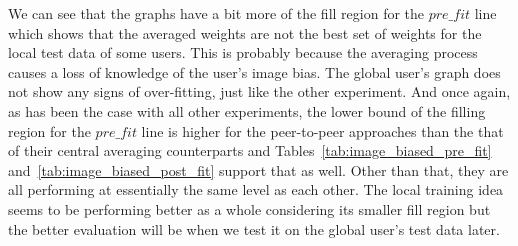 \documentclass[12pt]{article}
\begin{document}
\noindent We can see that the graphs have a bit more of the fill region for the $pre\_fit$ line which shows that the averaged weights are not the best set of weights for the local test data of some users. This is probably because the averaging process causes a loss of knowledge of the user's image bias. The global user's graph does not show any signs of over-fitting, just like the other experiment. And once again, as has been the case with all other experiments, the lower bound of the filling region for the $pre\_fit$ line is higher for the peer-to-peer approaches than the that of their central averaging counterparts and Tables~\ref{tab:image_biased_pre_fit} and~\ref{tab:image_biased_post_fit} support that as well. Other than that, they are all performing at essentially the same level as each other. The local training idea seems to be performing better as a whole considering its smaller fill region but the better evaluation will be when we test it on the global user's test data later.
\begin{table}[H] %
\def\arraystretch{1.2}%
\caption{Images dataset: Pre fit results at the end of the rounds from testing user models with $P = 0.7$.} \label{tab:image_biased_pre_fit}
\end{table}
\end{document}
